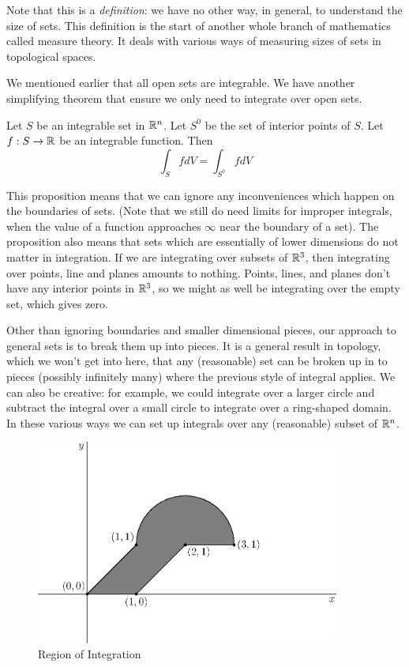 \documentclass[fleqn,letterpaper]{report}
\begin{document}
Note that this is a \emph{definition}: we have no other way,
in general, to understand the size of sets. This definition
is the start of another whole branch of mathematics called
measure theory. It deals with various ways of measuring sizes
of sets in topological spaces.

We mentioned earlier that all open sets are integrable. We
have another simplifying theorem that ensure we only need to
integrate over open sets.
\begin{prop}
Let $S$ be an integrable set in $\mathbb{R}^n$. Let $S^0$ be the set
of interior points of $S$. Let $f: S \rightarrow \mathbb{R}$ be an
integrable function. Then 
\begin{equation*}
\int_S f dV = \int_{S^0} f dV
\end{equation*}
\end{prop}

This proposition means that we can ignore any inconveniences
which happen on the boundaries of sets. (Note that we still do
need limits for improper integrals, when the value of a
function approaches $\infty$ near the boundary of a set). The
proposition also means that sets which are essentially of
lower dimensions do not matter in integration. If we are
integrating over subsets of $\mathbb{R}^3$, then integrating over
points, line and planes amounts to nothing. Points, lines,
and planes don't have any interior points in $\mathbb{R}^3$, so we
might as well be integrating over the empty set, which gives
zero.

Other than ignoring boundaries and smaller dimensional pieces,
our approach to general sets is to break them up into pieces.
It is a general result in topology, which we won't get into
here, that any (reasonable) set can be broken up in to pieces
(possibly infinitely many) where the previous style of
integral applies. We can also be creative: for example, we
could integrate over a larger circle and subtract the integral
over a small circle to integrate over a ring-shaped domain.
In these various ways we can set up integrals over any
(reasonable) subset of $\mathbb{R}^n$.

\begin{figure}[t]
\centering
\includegraphics[width=10cm]{figure01.eps}
\caption{Region of Integration}
\label{figure-integral-example}
\end{figure} 
\newpage
\end{document}

